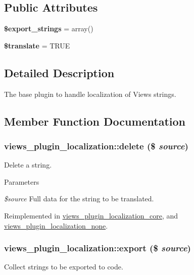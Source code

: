 \subsection*{Public Attributes}
\begin{DoxyCompactItemize}
\item 
\hypertarget{classviews__plugin__localization_af375c669c475f6868944f016be3fccf2}{
{\bfseries \$export\_\-strings} = array()}
\label{classviews__plugin__localization_af375c669c475f6868944f016be3fccf2}

\item 
\hypertarget{classviews__plugin__localization_a69a531a9293f43d75b189ff989c6e0ae}{
{\bfseries \$translate} = TRUE}
\label{classviews__plugin__localization_a69a531a9293f43d75b189ff989c6e0ae}

\end{DoxyCompactItemize}


\subsection{Detailed Description}
The base plugin to handle localization of Views strings. 

\subsection{Member Function Documentation}
\hypertarget{classviews__plugin__localization_a52726c9177d4dcf033ac81c8287bb5f6}{
\subsubsection[{delete}]{\setlength{\rightskip}{0pt plus 5cm}views\_\-plugin\_\-localization::delete (\$ {\em source})}}
\label{classviews__plugin__localization_a52726c9177d4dcf033ac81c8287bb5f6}
Delete a string.


\begin{DoxyParams}{Parameters}
\item[{\em \$source}]Full data for the string to be translated. \end{DoxyParams}


Reimplemented in \hyperlink{classviews__plugin__localization__core_a9d1aef13f48d44133c19dcde49c9e123}{views\_\-plugin\_\-localization\_\-core}, and \hyperlink{classviews__plugin__localization__none_ad92bca64ae753d74f2f61d41e2638625}{views\_\-plugin\_\-localization\_\-none}.\hypertarget{classviews__plugin__localization_a68c74a8cc99b0b52046064eac84cb07f}{
\subsubsection[{export}]{\setlength{\rightskip}{0pt plus 5cm}views\_\-plugin\_\-localization::export (\$ {\em source})}}
\label{classviews__plugin__localization_a68c74a8cc99b0b52046064eac84cb07f}
Collect strings to be exported to code.


